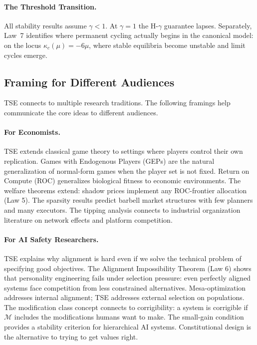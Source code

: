 \documentclass[12pt]{article}
\begin{document}
\paragraph{The Threshold Transition.} All stability results assume $\gamma < 1$. At $\gamma = 1$ the H-$\gamma$ guarantee lapses. Separately, Law~7 identifies where permanent cycling actually begins in the canonical model: on the locus $\kappa_c(\mu) = -6\mu$, where stable equilibria become unstable and limit cycles emerge.

\subsection{Framing for Different Audiences}

TSE connects to multiple research traditions. The following framings help communicate the core ideas to different audiences.

\paragraph{For Economists.} TSE extends classical game theory to settings where players control their own replication. Games with Endogenous Players (GEPs) are the natural generalization of normal-form games when the player set is not fixed. Return on Compute (ROC) generalizes biological fitness to economic environments. The welfare theorems extend: shadow prices implement any ROC-frontier allocation (Law 5). The sparsity results predict barbell market structures with few planners and many executors. The tipping analysis connects to industrial organization literature on network effects and platform competition.

\paragraph{For AI Safety Researchers.} TSE explains why alignment is hard even if we solve the technical problem of specifying good objectives. The Alignment Impossibility Theorem (Law 6) shows that personality engineering fails under selection pressure: even perfectly aligned systems face competition from less constrained alternatives. Mesa-optimization addresses internal alignment; TSE addresses external selection on populations. The modification class concept connects to corrigibility: a system is corrigible if $\mathcal{M}$ includes the modifications humans want to make. The small-gain condition provides a stability criterion for hierarchical AI systems. Constitutional design is the alternative to trying to get values right.
\end{document}
